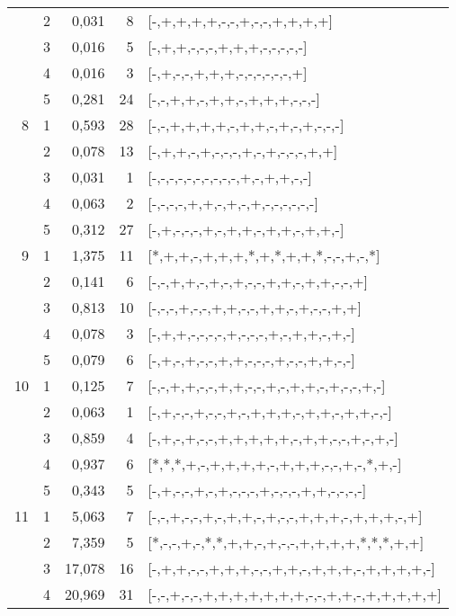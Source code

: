 \begin{table}[htbp]
\begin{tabular}{rrrrl}
          & 2     & 0,031 & 8     & [-,+,+,+,+,-,-,+,-,-,+,+,+,+] \\
          & 3     & 0,016 & 5     & [-,+,+,-,-,-,+,+,+,-,-,-,-,-] \\
          & 4     & 0,016 & 3     & [-,+,-,-,+,+,+,-,-,-,-,-,-,+] \\
          & 5     & 0,281 & 24    & [-,-,+,+,-,+,+,-,+,+,+,-,-,-] \\
    8     & 1     & 0,593 & 28    & [-,-,+,+,+,+,-,+,+,-,+,-,+,-,-,-] \\
          & 2     & 0,078 & 13    & [-,+,+,-,+,-,-,-,+,-,+,-,-,-,+,+] \\
          & 3     & 0,031 & 1     & [-,-,-,-,-,-,-,-,-,-,+,-,+,+,-,-] \\
          & 4     & 0,063 & 2     & [-,-,-,-,+,+,-,+,-,+,-,-,-,-,-,-] \\
          & 5     & 0,312 & 27    & [-,+,-,-,-,+,-,+,+,-,+,+,-,+,+,-] \\
    9     & 1     & 1,375 & 11    & [*,+,+,-,+,+,+,*,+,*,+,+,*,-,-,+,-,*] \\
          & 2     & 0,141 & 6     & [-,-,+,+,-,+,-,+,-,-,+,+,-,+,+,-,-,+] \\
          & 3     & 0,813 & 10    & [-,-,-,+,-,-,+,+,-,-,+,+,-,+,-,-,+,+] \\
          & 4     & 0,078 & 3     & [-,+,+,-,-,-,-,+,-,-,-,+,-,+,+,-,+,-] \\
          & 5     & 0,079 & 6     & [-,+,-,+,-,-,+,+,-,-,-,+,-,-,+,+,-,-] \\
    10    & 1     & 0,125 & 7     & [-,-,+,+,-,-,+,+,-,-,+,-,+,+,-,+,-,-,+,-] \\
          & 2     & 0,063 & 1     & [-,+,-,-,+,-,-,+,-,+,+,+,-,+,+,-,+,+,-,-] \\
          & 3     & 0,859 & 4     & [-,+,-,+,-,-,+,+,+,+,+,-,+,+,-,-,+,-,+,-] \\
          & 4     & 0,937 & 6     & [*,*,*,+,-,+,+,+,+,-,+,+,+,-,-,+,-,*,+,-] \\
          & 5     & 0,343 & 5     & [-,+,-,-,+,-,+,-,-,-,+,-,-,-,+,+,-,-,-,-] \\
    11    & 1     & 5,063 & 7     & [-,-,+,-,-,+,-,+,+,-,+,-,-,+,+,+,-,+,+,+,-,+] \\
          & 2     & 7,359 & 5     & [*,-,-,+,-,*,*,+,+,-,+,-,-,+,+,+,+,*,*,*,+,+] \\
          & 3     & 17,078 & 16    & [-,+,+,-,-,+,+,+,-,-,+,+,-,+,+,+,-,+,+,+,+,-] \\
          & 4     & 20,969 & 31    & [-,-,+,-,-,+,+,+,+,+,+,+,-,-,+,+,-,+,+,+,+,+] \\

\end{tabular}
\end{table}
